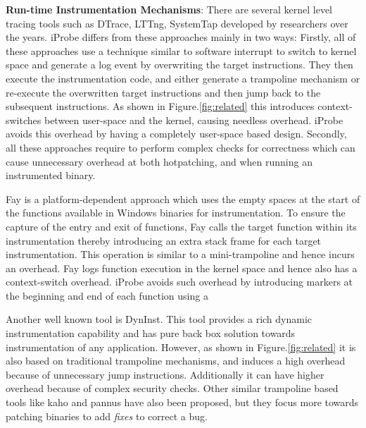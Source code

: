 \noindent \textbf{Run-time Instrumentation Mechanisms}: \quad
There are several kernel level tracing tools such as DTrace, LTTng, SystemTap \cite{dtrace,lttng,systemtap} developed by researchers over the years.
iProbe differs from these approaches mainly in two ways: Firstly, all of these approaches use a technique similar to software interrupt to switch to kernel space and generate a log event by overwriting the target instructions. 
They then execute the instrumentation code, and either generate a trampoline mechanism or re-execute the overwritten target instructions and then jump back to the subsequent instructions. 
As shown in Figure.\ref{fig:related} this introduces context-switches between user-space and the kernel, causing needless overhead. 
iProbe avoids this overhead by having a completely user-space based design.
Secondly, all these approaches require to perform complex checks for correctness which can cause unnecessary overhead at both hotpatching, and when running an instrumented binary. 

Fay \cite{fay} is a platform-dependent approach which uses the empty spaces at the start of the functions available in Windows binaries for instrumentation. 
To ensure the capture of the entry and exit of functions, Fay calls the target function within its instrumentation thereby introducing an extra stack frame for each target instrumentation. 
This operation is similar to a mini-trampoline and hence incurs an overhead. 
Fay logs function execution in the kernel space and hence also has a context-switch overhead.
iProbe avoids such overhead by introducing markers at the beginning and end of
each function using a 

Another well known tool is DynInst\cite{dyninst}. This tool provides a rich dynamic instrumentation capability and has pure back box solution towards instrumentation of any application.
However, as shown in Figure.\ref{fig:related} it is also based on traditional trampoline mechanisms, and induces a high overhead because of unnecessary jump instructions.
Additionally it can have higher overhead because of complex security checks. 
Other similar trampoline based tools like kaho and pannus\cite{pannus,kaho} have also been proposed, but they focus more towards patching binaries to add \emph{fixes} to correct a bug.


